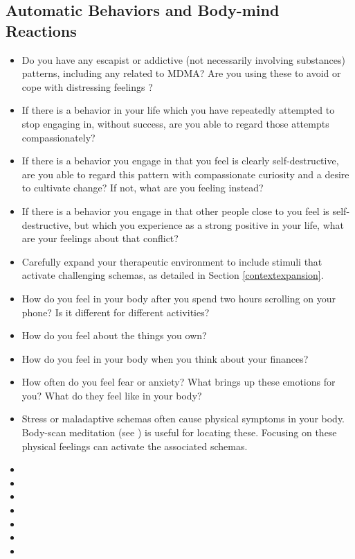 \documentclass[12pt,letterpaper]{book}
\begin{document}
\subsection*{Automatic Behaviors and Body-mind Reactions}
\begin{itemize}
    \item Do you have any escapist or addictive (not necessarily involving substances) patterns, including any related to MDMA? Are you using these to avoid or cope with distressing feelings \cite{forsterTraumaAddiction,alaviBehavioralAddiction}?
    \item If there is a behavior in your life which you have repeatedly attempted to stop engaging in, without success, are you able to regard those attempts compassionately?
    \item If there is a behavior you engage in that you feel is clearly self-destructive, are you able to regard this pattern with compassionate curiosity and a desire to cultivate change? If not, what are you feeling instead?
    \item If there is a behavior you engage in that other people close to you feel is self-destructive, but which you experience as a strong positive in your life, what are your feelings about that conflict?
    \item Carefully expand your therapeutic environment to include stimuli that activate challenging schemas, as detailed in Section \ref{contextexpansion}.
    \item How do you feel in your body after you spend two hours scrolling on your phone? Is it different for different activities?
    \item How do you feel about the things you own?
    \item How do you feel in your body when you think about your finances?
    \item How often do you feel fear or anxiety? What brings up these emotions for you? What do they feel like in your body?
    \item Stress or maladaptive schemas often cause physical symptoms in your body. Body-scan meditation (see \textcite{bodyscan}) is useful for locating these. Focusing on these physical feelings can activate the associated schemas.
\end{itemize}

\begin{itemize}
    \item {}
    \item {}
    \item {}
    \item {}
    \item {}
    \item {}
    \item {}
\end{itemize}
\end{document}
